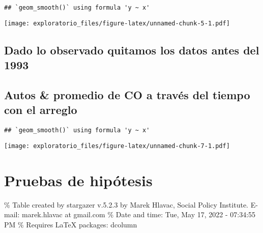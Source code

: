 \documentclass[
]{article}
\begin{document}
\begin{verbatim}
## `geom_smooth()` using formula 'y ~ x'
\end{verbatim}

\texttt{[image: exploratorio\_files/figure-latex/unnamed-chunk-5-1.pdf]}

\hypertarget{dado-lo-observado-quitamos-los-datos-antes-del-1993}{%
\subsection{Dado lo observado quitamos los datos antes del
1993}\label{dado-lo-observado-quitamos-los-datos-antes-del-1993}}

\hypertarget{autos-promedio-de-co-a-travuxe9s-del-tiempo-con-el-arreglo}{%
\subsection{Autos \& promedio de CO a través del tiempo con el
arreglo}\label{autos-promedio-de-co-a-travuxe9s-del-tiempo-con-el-arreglo}}

\begin{verbatim}
## `geom_smooth()` using formula 'y ~ x'
\end{verbatim}

\texttt{[image: exploratorio\_files/figure-latex/unnamed-chunk-7-1.pdf]}

\hypertarget{pruebas-de-hipuxf3tesis}{%
\section{Pruebas de hipótesis}\label{pruebas-de-hipuxf3tesis}}

\% Table created by stargazer v.5.2.3 by Marek Hlavac, Social Policy
Institute. E-mail: marek.hlavac at gmail.com \% Date and time: Tue, May
17, 2022 - 07:34:55 PM \% Requires LaTeX packages: dcolumn
\end{document}
